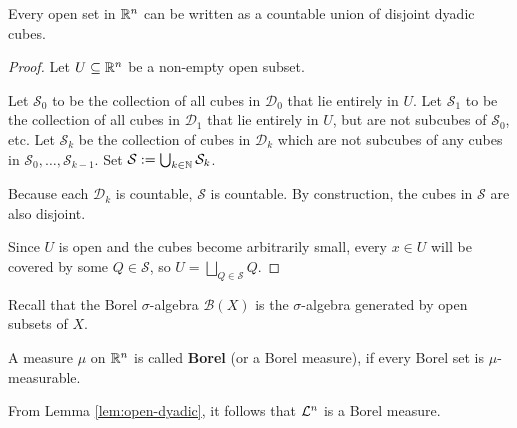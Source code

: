 \begin{lem}[] \label{lem:open-dyadic}
  Every open set in $\mathbb{R}^{n}$ can be written as a countable union of disjoint dyadic cubes.
\end{lem}
\begin{proof}
Let $U \subseteq \mathbb{R}^{n}$ be a non-empty open subset.

Let $\mathcal{S}_0$ to be the collection of all cubes in $\mathcal{D}_0$ that lie entirely in $U$.
Let $\mathcal{S}_1$ to be the collection of all cubes in $\mathcal{D}_1$ that lie entirely in $U$, but are not subcubes of $\mathcal{S}_0$, etc.
Let $\mathcal{S}_k$ be the collection of cubes in $\mathcal{D}_k$ which are not subcubes of any cubes in $\mathcal{S}_0, \ldots, \mathcal{S}_{k-1}$.
Set $\mathcal{S} := \bigcup_{k \in \mathbb{N}}\mathcal{S}_k$.

Because each $\mathcal{D}_k$ is countable, $\mathcal{S}$ is countable.
By construction, the cubes in $\mathcal{S}$ are also disjoint.

Since $U$ is open and the cubes become arbitrarily small, every $x \in U$ will be covered by some $Q \in \mathcal{S}$, so $U = \bigsqcup_{Q \in \mathcal{S}}Q$.

\end{proof}

Recall that the Borel $\sigma$-algebra $\mathcal{B}(X)$ is the $\sigma$-algebra generated by open subsets of $X$.

\begin{dfn}[]
  A measure $\mu$ on $\mathbb{R}^{n}$ is called \textbf{Borel} (or a Borel measure), if every Borel set is $\mu$-measurable.
\end{dfn}

From Lemma \ref{lem:open-dyadic}, it follows that $\mathcal{L}^{n}$ is a Borel measure.

